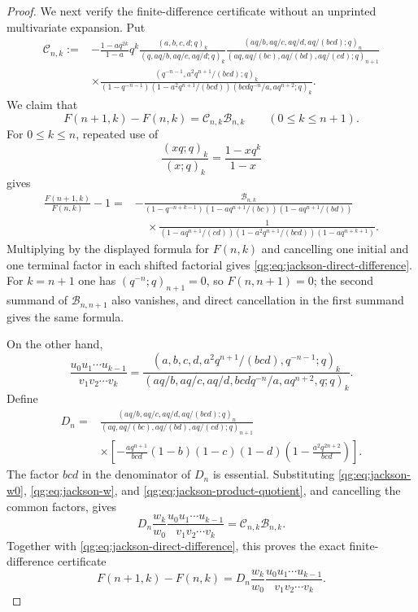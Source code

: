 \begin{proof}
We next verify the finite-difference certificate without an unprinted
multivariate expansion.  Put
\begin{align*}
\mathcal C_{n,k}:={}&-
 \frac{1-aq^{2k}}{1-a}q^k
 \frac{(a,b,c,d;q)_k}{(q,aq/b,aq/c,aq/d;q)_k}
 \frac{(aq/b,aq/c,aq/d,aq/(bcd);q)_n}
 {(aq,aq/(bc),aq/(bd),aq/(cd);q)_{n+1}}\\
&\times
 \frac{(q^{-n-1},a^2q^{n+1}/(bcd);q)_k}
 {(1-q^{-n-1})(1-a^2q^{n+1}/(bcd))
  (bcdq^{-n}/a,aq^{n+2};q)_k}.
\end{align*}
We claim that
\begin{equation}
\label{qg:eq:jackson-direct-difference}
 F(n+1,k)-F(n,k)=\mathcal C_{n,k}\mathcal B_{n,k}
 \qquad(0\le k\le n+1).
\end{equation}
For $0\le k\le n$, repeated use of
\[
 \frac{(xq;q)_k}{(x;q)_k}=\frac{1-xq^k}{1-x}
\]
gives
\begin{align*}
\frac{F(n+1,k)}{F(n,k)}-1
={}&-\frac{\mathcal B_{n,k}}
{(1-q^{-n+k-1})(1-aq^{n+1}/(bc))(1-aq^{n+1}/(bd))}\\
&\quad\times
\frac1{(1-aq^{n+1}/(cd))(1-a^2q^{n+1}/(bcd))
(1-aq^{n+k+1})}.
\end{align*}
Multiplying by the displayed formula for $F(n,k)$ and cancelling one initial
and one terminal factor in each shifted factorial gives
\eqref{qg:eq:jackson-direct-difference}.  For $k=n+1$ one has
$(q^{-n};q)_{n+1}=0$, so $F(n,n+1)=0$; the second summand of
\(\mathcal B_{n,n+1}\) also vanishes, and direct cancellation in the first
summand gives the same formula.

On the other hand,
\begin{equation}
\label{qg:eq:jackson-product-quotient}
 \frac{u_0u_1\cdots u_{k-1}}{v_1v_2\cdots v_k}
 =\frac{(a,b,c,d,a^2q^{n+1}/(bcd),q^{-n-1};q)_k}
 {(aq/b,aq/c,aq/d,bcdq^{-n}/a,aq^{n+2},q;q)_k}.
\end{equation}
Define
\begin{align*}
D_n={}&
 \frac{(aq/b,aq/c,aq/d,aq/(bcd);q)_n}
 {(aq,aq/(bc),aq/(bd),aq/(cd);q)_{n+1}}\\
&\times\left[-\frac{aq^{n+1}}{bcd}(1-b)(1-c)(1-d)
 \left(1-\frac{a^2q^{2n+2}}{bcd}\right)\right].
\end{align*}
The factor $bcd$ in the denominator of $D_n$ is essential.  Substituting
\eqref{qg:eq:jackson-w0}, \eqref{qg:eq:jackson-w}, and
\eqref{qg:eq:jackson-product-quotient}, and cancelling the common factors,
gives
\[
 D_n\frac{w_k}{w_0}
 \frac{u_0u_1\cdots u_{k-1}}{v_1v_2\cdots v_k}
 =\mathcal C_{n,k}\mathcal B_{n,k}.
\]
Together with \eqref{qg:eq:jackson-direct-difference}, this proves the exact
finite-difference certificate
\begin{equation}
\label{qg:eq:jackson-finite-difference}
 F(n+1,k)-F(n,k)
 =D_n\frac{w_k}{w_0}
 \frac{u_0u_1\cdots u_{k-1}}{v_1v_2\cdots v_k}.
\end{equation}


\end{proof}
